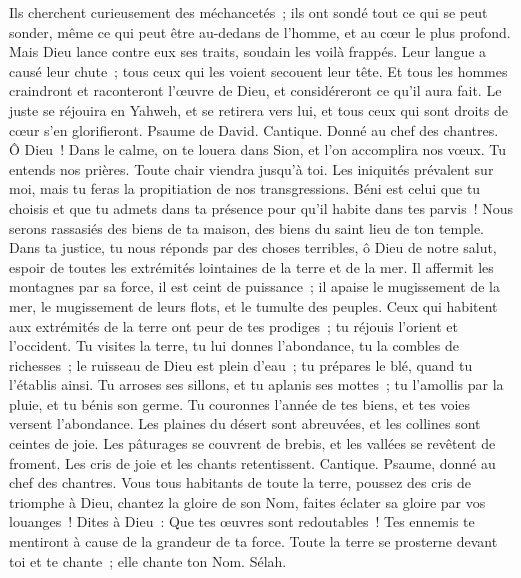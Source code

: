 \begin{multicols}{2}
Ils cherchent curieusement des méchancetés~; ils ont sondé tout ce qui se peut sonder, même ce qui peut être au-dedans de l'homme, et au cœur le plus profond.
Mais Dieu lance contre eux ses traits, soudain les voilà frappés.
Leur langue a causé leur chute~; tous ceux qui les voient secouent leur tête.
Et tous les hommes craindront et raconteront l'œuvre de Dieu, et considéreront ce qu'il aura fait.
Le juste se réjouira en Yahweh, et se retirera vers lui, et tous ceux qui sont droits de cœur s'en glorifieront.
\VerseOne{}Psaume de David. Cantique. Donné au chef des chantres.
Ô Dieu~! Dans le calme, on te louera dans Sion, et l'on accomplira nos vœux.
Tu entends nos prières. Toute chair viendra jusqu'à toi.
Les iniquités prévalent sur moi, mais tu feras la propitiation de nos transgressions.
Béni est celui que tu choisis et que tu admets dans ta présence pour qu'il habite dans tes parvis~! Nous serons rassasiés des biens de ta maison, des biens du saint lieu de ton temple.
Dans ta justice, tu nous réponds par des choses terribles, ô Dieu de notre salut, espoir de toutes les extrémités lointaines de la terre et de la mer.
Il affermit les montagnes par sa force, il est ceint de puissance~;
il apaise le mugissement de la mer, le mugissement de leurs flots, et le tumulte des peuples.
Ceux qui habitent aux extrémités de la terre ont peur de tes prodiges~; tu réjouis l'orient et l'occident.
Tu visites la terre, tu lui donnes l'abondance, tu la combles de richesses~; le ruisseau de Dieu est plein d'eau~; tu prépares le blé, quand tu l'établis ainsi.
Tu arroses ses sillons, et tu aplanis ses mottes~; tu l'amollis par la pluie, et tu bénis son germe.
Tu couronnes l'année de tes biens, et tes voies versent l'abondance.
Les plaines du désert sont abreuvées, et les collines sont ceintes de joie.
Les pâturages se couvrent de brebis, et les vallées se revêtent de froment. Les cris de joie et les chants retentissent.
\VerseOne{}Cantique. Psaume, donné au chef des chantres. Vous tous habitants de toute la terre, poussez des cris de triomphe à Dieu,
chantez la gloire de son Nom, faites éclater sa gloire par vos louanges~!
Dites à Dieu~: Que tes œuvres sont redoutables~! Tes ennemis te mentiront à cause de la grandeur de ta force.
Toute la terre se prosterne devant toi et te chante~; elle chante ton Nom. Sélah.

\end{multicols}
